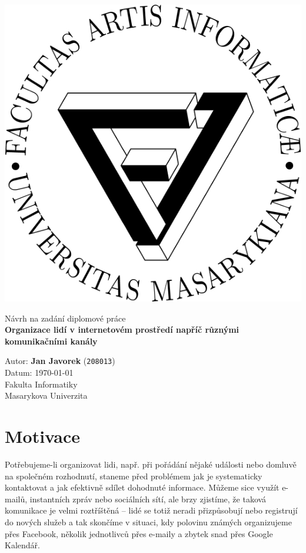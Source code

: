 \documentclass[a4paper,12pt]{article}
\begin{document}
\begin{titlepage}

\begin{center}
	\includegraphics[keepaspectratio]{fi-logo}
\end{center}

\vfill %
	\begin{center}
		\LARGE{Návrh na zadání diplomové práce}\\
		\vfill
		\bf{Organizace lidí v internetovém prostředí napříč různými komunikačními kanály}
	\end{center}
\vfill

\noindent
Autor: {\bf Jan Javorek} ({\tt 208013})\\
Datum: \today \\
Fakulta Informatiky\\
Masarykova Univerzita

\end{titlepage}



\section{Motivace}
Potřebujeme-li organizovat lidi, např. při pořádání nějaké události nebo domluvě na společném rozhodnutí, staneme před problémem jak je systematicky kontaktovat a jak efektivně sdílet dohodnuté informace. Můžeme sice využít e-mailů, instantních zpráv nebo sociálních sítí, ale brzy zjistíme, že taková komunikace je velmi roztříštěná -- lidé se totiž neradi přizpůsobují nebo registrují do nových služeb a tak skončíme v situaci, kdy polovinu známých organizujeme přes Facebook, několik jednotlivců přes e-maily a zbytek snad
přes Google Kalendář.
\end{document}
